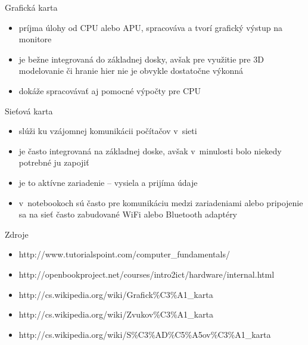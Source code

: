\documentclass[pdf,fyma]{prosper}
\begin{document}
\begin{slide}{Grafická karta}
\begin{itemize}
\item príjma úlohy od CPU alebo APU, spracováva a tvorí grafický výstup na monitore
\item je bežne integrovaná do základnej dosky, avšak pre využitie pre 3D modelovanie či hranie hier nie je obvykle dostatočne výkonná
\item dokáže spracovávať aj pomocné výpočty pre CPU
\end{itemize}
\begin{figure}[ht]
  \begin{center}
  \label{graphics}
  \end{center}
\end{figure}
\end{slide}

\begin{slide}{Sieťová karta}
\begin{itemize}
\item slúži ku vzájomnej komunikácii počítačov v~sieti
\item je často integrovaná na základnej doske, avšak v~minulosti bolo niekedy potrebné ju zapojiť
\item je to aktívne zariadenie -- vysiela a prijíma údaje
\item v~notebookoch sú často pre komunikáciu medzi zariadeniami alebo pripojenie sa na sieť často zabudované WiFi alebo Bluetooth adaptéry
\end{itemize}
\end{slide}

\begin{slide}{Zdroje}
\begin{itemize}
\item\tiny http://www.tutorialspoint.com/computer\_fundamentals/
\item\tiny http://openbookproject.net/courses/intro2ict/hardware/internal.html
\item\tiny http://cs.wikipedia.org/wiki/Grafick\%C3\%A1\_karta
\item\tiny http://cs.wikipedia.org/wiki/Zvukov\%C3\%A1\_karta
\item\tiny http://cs.wikipedia.org/wiki/S\%C3\%AD\%C5\%A5ov\%C3\%A1\_karta
\end{itemize}
\end{slide}
\end{document}
